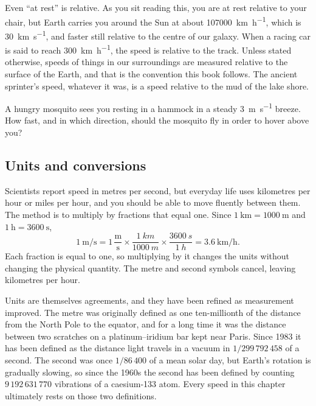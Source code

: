 \documentclass[11pt,twoside,openany]{book}
\newcounter{check}[chapter]
\begin{document}
Even ``at rest'' is relative. As you sit reading this, you are at rest relative to your chair, but Earth carries you around the Sun at about \SI{107000}{\kilo\metre\per\hour}, which is \SI{30}{\kilo\metre\per\second}, and faster still relative to the centre of our galaxy. When a racing car is said to reach \SI{300}{\kilo\metre\per\hour}, the speed is relative to the track. Unless stated otherwise, speeds of things in our surroundings are measured relative to the surface of the Earth, and that is the convention this book follows. The ancient sprinter's speed, whatever it was, is a speed relative to the mud of the lake shore.

\begin{checkbox}
A hungry mosquito sees you resting in a hammock in a steady \SI{3}{\metre\per\second} breeze. How fast, and in which direction, should the mosquito fly in order to hover above you?
\end{checkbox}

\subsection{Units and conversions}

Scientists report speed in metres per second, but everyday life uses kilometres per hour or miles per hour, and you should be able to move fluently between them. The method is to multiply by fractions that equal one. Since $\SI{1}{\kilo\metre} = \SI{1000}{\metre}$ and $\SI{1}{\hour} = \SI{3600}{\second}$,
\[
\SI{1}{\metre\per\second}
 = 1\,\frac{\text{m}}{\text{s}}\times\frac{\SI{1}{km}}{\SI{1000}{m}}\times\frac{\SI{3600}{s}}{\SI{1}{h}}
 = \SI{3.6}{\kilo\metre\per\hour}.
\]
Each fraction is equal to one, so multiplying by it changes the units without changing the physical quantity. The metre and second symbols cancel, leaving kilometres per hour.

\begin{modelnote}
Units are themselves agreements, and they have been refined as measurement improved. The metre was originally defined as one ten-millionth of the distance from the North Pole to the equator, and for a long time it was the distance between two scratches on a platinum--iridium bar kept near Paris. Since 1983 it has been defined as the distance light travels in a vacuum in $1/299\,792\,458$ of a second. The second was once $1/86\,400$ of a mean solar day, but Earth's rotation is gradually slowing, so since the 1960s the second has been defined by counting $9\,192\,631\,770$ vibrations of a caesium-133 atom. Every speed in this chapter ultimately rests on those two definitions.
\end{modelnote}
\end{document}
